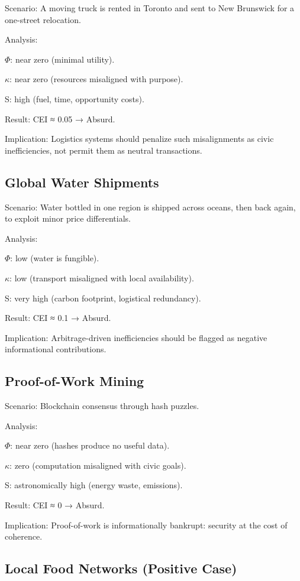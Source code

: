\documentclass{book}
\begin{document}
Scenario: A moving truck is rented in Toronto and sent to New Brunswick for a one-street relocation.

Analysis:

\(\Phi\): near zero (minimal utility).

\(\kappa\): near zero (resources misaligned with purpose).

S: high (fuel, time, opportunity costs).

Result: CEI ≈ 0.05 → Absurd.

Implication: Logistics systems should penalize such misalignments as civic inefficiencies, not permit them as neutral transactions.

\subsection{Global Water Shipments}

Scenario: Water bottled in one region is shipped across oceans, then back again, to exploit minor price differentials.

Analysis:

\(\Phi\): low (water is fungible).

\(\kappa\): low (transport misaligned with local availability).

S: very high (carbon footprint, logistical redundancy).

Result: CEI ≈ 0.1 → Absurd.

Implication: Arbitrage-driven inefficiencies should be flagged as negative informational contributions.

\subsection{Proof-of-Work Mining}

Scenario: Blockchain consensus through hash puzzles.

Analysis:

\(\Phi\): near zero (hashes produce no useful data).

\(\kappa\): zero (computation misaligned with civic goals).

S: astronomically high (energy waste, emissions).

Result: CEI ≈ 0 → Absurd.

Implication: Proof-of-work is informationally bankrupt: security at the cost of coherence.

\subsection{Local Food Networks (Positive Case)}
\end{document}
